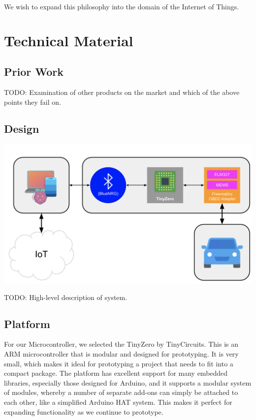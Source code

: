 \documentclass[10pt,letterpaper,unboxed,cm]{article}
\newcommand{\todo}{\color{red} TODO: \color{black}}
\begin{document}
We wish to expand this philosophy into the domain of the Internet of Things.

\section{Technical Material}

\subsection{Prior Work}

\todo Examination of other products on the market and which of the above points they fail on.

\subsection{Design}

\begin{center}
\includegraphics[width=0.7\linewidth]{pathway.png}
\end{center}

\todo High-level description of system.

\subsection{Platform}

For our Microcontroller, we selected the TinyZero by TinyCircuits. This is an ARM microcontroller that is modular and designed for prototyping. It is very small, which makes it ideal for prototyping a project that needs to fit into a compact package. The platform has excellent support for many embedded libraries, especially those designed for Arduino, and it supports a modular system of  modules, whereby a number of separate add-ons can simply be attached to each other, like a simplified Arduino HAT system. This makes it perfect for expanding functionality as we continue to prototype.
\end{document}
